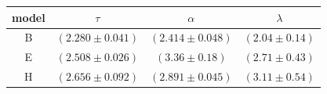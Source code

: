 \begin{tabular}{cccc}
\toprule
model & $\tau$ & $\alpha$ & $\lambda$ \\
\midrule
B & $ (2.280\pm0.041) $ & $ (2.414\pm0.048) $ & $ (2.04\pm0.14) $ \\
E & $ (2.508\pm0.026) $ & $ (3.36\pm0.18) $ & $ (2.71\pm0.43) $ \\
H & $ (2.656\pm0.092) $ & $ (2.891\pm0.045) $ & $ (3.11\pm0.54) $ \\
\bottomrule
\end{tabular}
